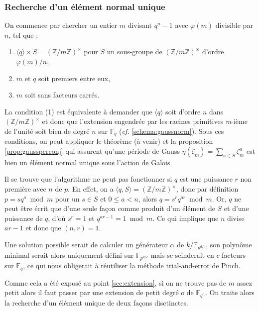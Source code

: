 \documentclass[a4paper]{article} %
\numberwithin{section}{part}
\numberwithin{equation}{section}
\newcommand\nroot[1]{\textit{#1}-ième}
\newcommand\zmodninv[1]{(\mathbb{Z}/#1\mathbb{Z})^{\times}}
\newcommand\GF[1]{\mathbb{F}_{#1}}
\begin{document}
\subsubsection*{Recherche d'un élément normal unique}
On commence par chercher un entier $m$ divisant $q^n - 1$ avec $\varphi(m)$
divisible par $n$, tel que :
\vspace{0.3cm}
\begin{enumerate}[(1)]
\item $\langle{q}\rangle \times S = \zmodninv{m}$ pour $S$ 
un sous-groupe de $\zmodninv{m}$ d'ordre $\varphi(m)/n$,
\item $m$ et $q$ soit premiers entre eux,
\item $m$ soit sans facteurs carrés.
\end{enumerate}
\vspace{0.3cm}
La condition (1) est équivalente à demander que $\langle{q}\rangle$ soit d'ordre
$n$ dans $\zmodninv{m}$ et donc que l'extension engendrée par les racines
primitives \nroot{m} de l'unité soit bien de degré $n$ sur $\GF{q}$ (\emph{cf.}
\ref{schema:gaussnorm}). Sous ces conditions, on peut appliquer le théorème (à
venir) et la proposition \ref{prop:gaussperconj} qui assurent qu'une période de 
Gauss $\eta(\zeta_m) = \sum_{a\in S}{\zeta_m^a}$ est bien un élément normal 
unique sous l'action de Galois.
\vspace{0.3cm}
\begin{rem}
Il se trouve que l'algorithme ne peut pas fonctionner si $q$ est une puissance
$r$ non première avec $n$ de $p$. En effet, on a $\langle{q,S}\rangle = 
\zmodninv{m}$, donc par définition $p = sq^a\bmod m$ pour un $s\in S$ et $0 
\leq a < n$, alors $q=s^rq^{ar} \bmod m$. Or, $q$ ne peut être écrit que d'une 
seule façon comme produit d'un élément de $S$ et d'une puissance de $q$, d'où 
$s^r = 1$ et $q^{ar - 1} = 1 \bmod m$. Ce qui implique que $n$ divise $ar - 1$ 
et donc que $(n, r) = 1$.\par
Une solution possible serait de calculer un générateur $\alpha$ de 
$k/\GF{p^{d/c}}$, son polynôme minimal serait alors uniquement défini sur 
$\GF{p^{d/c}}$ mais se scinderait en $c$ facteurs sur $\GF{q}$, ce qui nous 
obligerait à réutiliser la méthode trial-and-error de Pinch.
\end{rem}
\vspace{0.3cm}
Comme cela a été exposé au point \ref{sec:extension}, si on ne trouve pas de $m$
assez petit alors il faut passer par une extension de petit degré $o$ de
$\GF{q^n}$. On traite alors la recherche d'un élément unique de deux façons
disctinctes.
 
\end{document}
